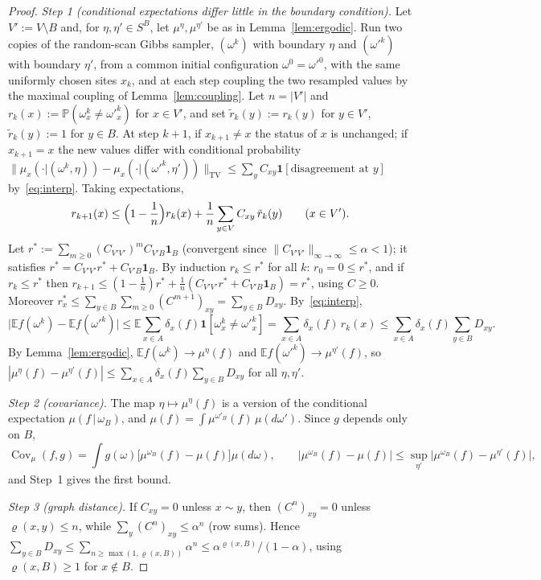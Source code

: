 \documentclass[11pt,a4paper]{article}
\theoremstyle{definition}
\theoremstyle{remark}
\DeclareMathOperator{\Cov}{Cov}
\newcommand{\E}{\mathbb{E}}
\newcommand{\norm}[1]{\lVert #1\rVert}
\newcommand{\TV}{\mathrm{TV}}
\begin{document}
\begin{proof}
\emph{Step 1 (conditional expectations differ little in the boundary condition).} Let $V':=V\setminus B$ and, for
$\eta,\eta'\in S^B$, let $\mu^\eta,\mu^{\eta'}$ be as in Lemma~\ref{lem:ergodic}. Run two copies of the random-scan Gibbs
sampler, $(\omega^k)$ with boundary $\eta$ and $(\omega'^k)$ with boundary $\eta'$, from a common initial configuration
$\omega^0=\omega'^0$, with the same uniformly chosen sites $x_k$, and at each step coupling the two resampled values by the
maximal coupling of Lemma~\ref{lem:coupling}. Let $n=|V'|$ and $r_k(x):=\mathbb P(\omega^k_x\ne\omega'^k_x)$ for $x\in V'$, and
set $\tilde r_k(y):=r_k(y)$ for $y\in V'$, $\tilde r_k(y):=1$ for $y\in B$. At step $k+1$, if $x_{k+1}\ne x$ the status of $x$
is unchanged; if $x_{k+1}=x$ the new values differ with conditional probability
$\norm{\mu_x(\cdot|(\omega^k,\eta))-\mu_x(\cdot|(\omega'^k,\eta'))}_\TV\le\sum_{y}C_{xy}\mathbf 1[\text{disagreement at }y]$
by~\eqref{eq:interp}. Taking expectations,
\[
r_{k+1}(x)\le\Bigl(1-\frac1n\Bigr)r_k(x)+\frac1n\sum_{y\in V}C_{xy}\,\tilde r_k(y)\qquad(x\in V').
\]
Let $r^*:=\sum_{m\ge0}(C_{V'V'})^mC_{V'B}\mathbf 1_B$ (convergent since $\norm{C_{V'V'}}_{\infty\to\infty}\le\alpha<1$); it
satisfies $r^*=C_{V'V'}r^*+C_{V'B}\mathbf 1_B$. By induction $r_k\le r^*$ for all $k$: $r_0=0\le r^*$, and if $r_k\le r^*$ then
$r_{k+1}\le(1-\frac1n)r^*+\frac1n(C_{V'V'}r^*+C_{V'B}\mathbf 1_B)=r^*$, using $C\ge0$. Moreover
$r^*_x\le\sum_{y\in B}\sum_{m\ge0}(C^{m+1})_{xy}=\sum_{y\in B}D_{xy}$. By~\eqref{eq:interp},
\[
\bigl|\E f(\omega^k)-\E f(\omega'^k)\bigr|\le\E\sum_{x\in A}\delta_x(f)\mathbf 1[\omega^k_x\ne\omega'^k_x]
=\sum_{x\in A}\delta_x(f)\,r_k(x)\le\sum_{x\in A}\delta_x(f)\sum_{y\in B}D_{xy}.
\]
By Lemma~\ref{lem:ergodic}, $\E f(\omega^k)\to\mu^\eta(f)$ and $\E f(\omega'^k)\to\mu^{\eta'}(f)$, so
$|\mu^\eta(f)-\mu^{\eta'}(f)|\le\sum_{x\in A}\delta_x(f)\sum_{y\in B}D_{xy}$ for all $\eta,\eta'$.

\emph{Step 2 (covariance).} The map $\eta\mapsto\mu^\eta(f)$ is a version of the conditional expectation $\mu(f\,|\,\omega_B)$,
and $\mu(f)=\int\mu^{\omega'_B}(f)\,\mu(d\omega')$. Since $g$ depends only on $B$,
\[
\Cov_\mu(f,g)=\int g(\omega)\bigl[\mu^{\omega_B}(f)-\mu(f)\bigr]\mu(d\omega),\qquad
\bigl|\mu^{\omega_B}(f)-\mu(f)\bigr|\le\sup_{\eta'}\bigl|\mu^{\omega_B}(f)-\mu^{\eta'}(f)\bigr|,
\]
and Step~1 gives the first bound.

\emph{Step 3 (graph distance).} If $C_{xy}=0$ unless $x\sim y$, then $(C^n)_{xy}=0$ unless $\varrho(x,y)\le n$, while
$\sum_y(C^n)_{xy}\le\alpha^n$ (row sums). Hence $\sum_{y\in B}D_{xy}\le\sum_{n\ge\max(1,\varrho(x,B))}\alpha^n\le\alpha^{\varrho(x,B)}/(1-\alpha)$,
using $\varrho(x,B)\ge1$ for $x\notin B$.
\end{proof}
\end{document}
